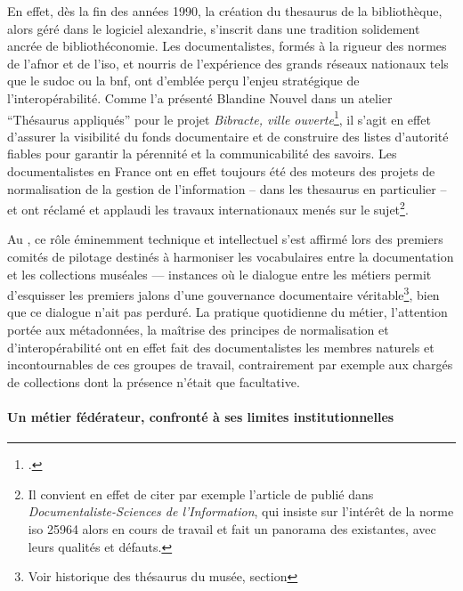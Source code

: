 En effet, dès la fin des années 1990, la création du \gls{thesaurus} de la bibliothèque, alors géré dans le logiciel \gls{alexandrie}, s’inscrit dans une tradition solidement ancrée de bibliothéconomie. Les documentalistes, formés à la rigueur des normes de l'\gls{afnor} et de l'\gls{iso}, et nourris de l’expérience des grands réseaux nationaux tels que le \ac{sudoc} ou la \ac{bnf}, ont d’emblée perçu l’enjeu stratégique de l’interopérabilité. Comme l'a présenté Blandine Nouvel dans un atelier \enquote{Thésaurus appliqués} pour le projet \textit{Bibracte, ville ouverte}\footcite{nouvelOutilsDindexationBibliothecaires2022}, il s’agit en effet d’assurer la visibilité du fonds documentaire et de construire des listes d’autorité fiables pour garantir la pérennité et la communicabilité des savoirs. Les documentalistes en France ont en effet toujours été des moteurs des projets de normalisation de la gestion de l'information -- dans les \gls{thesaurus} en particulier -- et ont réclamé et applaudi les travaux internationaux menés sur le sujet\footnote{Il convient en effet de citer par exemple l'article  de \citeauthor{chichereauNormesConceptionGestion2007} publié dans \textit{Documentaliste-Sciences de l'Information}, qui insiste sur l'intérêt de la norme \gls{iso} 25964 alors en cours de travail et fait un panorama des existantes, avec leurs qualités et défauts.}.



Au \mae, ce rôle éminemment technique et intellectuel s’est affirmé lors des premiers comités de pilotage destinés à harmoniser les vocabulaires entre la documentation et les collections muséales — instances où le dialogue entre les métiers permit d’esquisser les premiers jalons d’une gouvernance documentaire véritable\footnote{Voir historique des thésaurus du musée, section }, bien que ce dialogue n'ait pas perduré. La pratique quotidienne du métier, l’attention portée aux métadonnées, la maîtrise des principes de normalisation et d’interopérabilité ont en effet fait des documentalistes les membres naturels et incontournables de ces groupes de travail, contrairement par exemple aux chargés de collections dont la présence n'était que facultative.



\paragraph*{Un métier fédérateur, confronté à ses limites institutionnelles}

